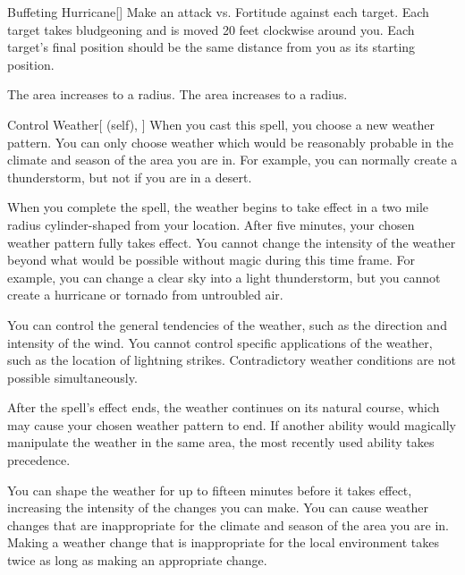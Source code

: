 \lowercase{\hypertarget{spell:Buffeting Hurricane}{}}\label{spell:Buffeting Hurricane}
\begin{freeability}[Rank 4]{\hypertarget{spell:Buffeting Hurricane}{Buffeting Hurricane}}[]
Make an attack vs. Fortitude against each target.
\hit Each target takes bludgeoning  and is moved 20 feet clockwise around you.
Each target's final position should be the same distance from you as its starting position.

\rankline
{} The area increases to a \arealarge radius.
 The area increases to a \areahuge radius.
\end{freeability}
\vspace{0.25em}



\lowercase{\hypertarget{spell:Control Weather}{}}\label{spell:Control Weather}
\begin{attuneability}[Rank 4]{\hypertarget{spell:Control Weather}{Control Weather}}[ (self), ]
\targetrule
When you cast this spell, you choose a new weather pattern.
You can only choose weather which would be reasonably probable in the climate and season of the area you are in.
For example, you can normally create a thunderstorm, but not if you are in a desert.

When you complete the spell, the weather begins to take effect in a two mile radius cylinder-shaped  from your location.
After five minutes, your chosen weather pattern fully takes effect.
You cannot change the intensity of the weather beyond what would be possible without magic during this time frame.
For example, you can change a clear sky into a light thunderstorm, but you cannot create a hurricane or tornado from untroubled air.

You can control the general tendencies of the weather, such as the direction and intensity of the wind.
You cannot control specific applications of the weather, such as the location of lightning strikes.
Contradictory weather conditions are not possible simultaneously.

After the spell's effect ends, the weather continues on its natural course, which may cause your chosen weather pattern to end.
If another ability would magically manipulate the weather in the same area, the most recently used ability takes precedence.

\rankline
{} You can shape the weather for up to fifteen minutes before it takes effect, increasing the intensity of the changes you can make.
 You can cause weather changes that are inappropriate for the climate and season of the area you are in.
Making a weather change that is inappropriate for the local environment takes twice as long as making an appropriate change.
\end{attuneability}
\vspace{0.25em}



